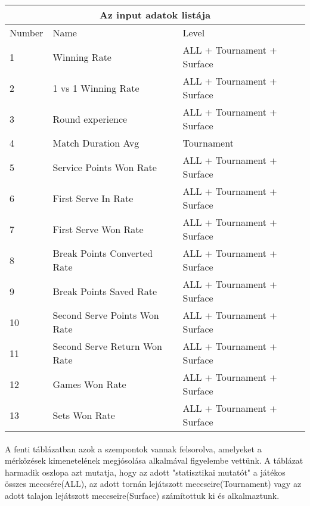 \begin{tabular}{ |p{2cm}||p{6cm}|p{6cm}|  }
 \hline
 \multicolumn{3}{|c|}{Az input adatok listája} \\
 \hline
  Number & Name & Level \\
 \hline
 1   & Winning Rate                  & ALL + Tournament + Surface \\
 2   & 1 vs 1 Winning Rate           & ALL + Tournament + Surface \\
 3   & Round experience              & ALL + Tournament + Surface \\
 4   & Match Duration Avg            & Tournament  \\
 5   & Service Points Won Rate       & ALL + Tournament + Surface \\
 6   & First Serve In Rate           & ALL + Tournament + Surface \\
 7   & First Serve Won Rate          & ALL + Tournament + Surface \\
 8   & Break Points Converted Rate   & ALL + Tournament + Surface \\
 9   & Break Points Saved Rate       & ALL + Tournament + Surface \\
 10  & Second Serve Points Won Rate  & ALL + Tournament + Surface \\
 11  & Second Serve Return Won Rate  & ALL + Tournament + Surface \\
 12  & Games Won Rate                & ALL + Tournament + Surface \\
 13  & Sets Won Rate                 & ALL + Tournament + Surface \\
 \hline
\end{tabular}

\paragraph{}
A fenti táblázatban azok a szempontok vannak  felsorolva, amelyeket a mérkőzések kimenetelének megjósolása alkalmával figyelembe vettünk. A táblázat harmadik oszlopa azt mutatja, hogy az adott "statisztikai mutatót" a játékos összes meccsére(ALL), az adott tornán lejátszott meccseire(Tournament) vagy az adott talajon lejátszott meccseire(Surface) számítottuk ki és alkalmaztunk.


